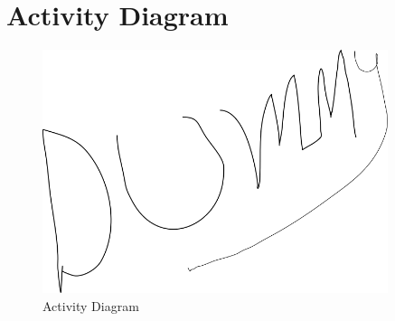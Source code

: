 \section{Activity Diagram}

\begin{figure}[h]
    \centering
    \includegraphics[width=0.9\textwidth]{images/dummy.png}
    \caption{Activity Diagram}
    \label{fig:Activity Diagram}
\end{figure}

\clearpage


